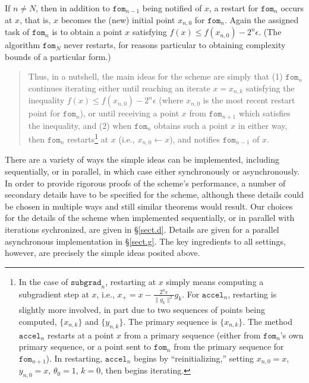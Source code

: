 \documentclass[reqno, 11pt]{amsart}
\numberwithin{equation}{section}
\newcommand{\fom}{\mathtt{fom}}
\newcommand{\subgrad}{\mathtt{subgrad}}
\newcommand{\accel}{\mathtt{accel}}
\begin{document}
If $ n \neq N $, then in addition to $ \fom_{n-1} $ being notified of $ x $, a restart for $ \fom_n $ occurs at $ x $, that is, $ x $ becomes the (new) initial point $ x_{n,0} $ for $ \fom_n $. Again the assigned task of $ \fom_n $ is to obtain a point $ x $ satisfying $ f(x) \leq f(x_{n,0}) -  2^n \epsilon $. (The algorithm $ \fom_N $ never restarts, for reasons particular to obtaining complexity bounds of a particular form.)
\vspace{2mm}

\begin{quote} 
Thus, in a nutshell, the main ideas for the scheme are simply that (1) $ \fom_n $ continues iterating either until reaching an iterate $ x = x_{n,k} $ satisfying the inequality $ f(x) \leq f(x_{n,0}) -  2^n \epsilon $ (where $ x_{n,0} $ is the most recent restart point for $ \fom_n $), or until receiving a point $ x $ from $ \fom_{n+1} $ which satisfies the inequality, and (2) when $ \fom_n $ obtains such a point $ x $ in either way, then $ \fom_n $ restarts\footnote{In the case of $ \subgrad_n $, restarting at $ x $ simply means computing a subgradient step at $ x $, i.e., $ x_+ = x - \frac{2^n \epsilon }{\| g_k \|^2} g_k $. For $ \accel_n $, restarting is slightly more involved, in part due to two sequences of points being computed, $ \{ x_{n,k} \} $ and $ \{  y_{n,k} \}  $. The primary sequence is $ \{ x_{n,k} \} $. The method $ \accel_n $ restarts at a point $ x $ from a primary sequence (either from $ \fom_n $'s own primary sequence, or a point sent to $ \fom_n $ from the primary sequence for $ \fom_{n+1} $). In restarting, $ \accel_n $ begins by ``reinitializing,'' setting $ x_{n,0} = x $, $ y_{n,0} = x $, $ \theta_0 = 1 $, $ k = 0 $, then begins iterating.} at $ x $ (i.e., $ x_{n,0} \leftarrow x $), and notifies $ \fom_{n-1} $ of $ x $.
\end{quote}
\vspace{2mm}

There are a variety of ways the simple ideas can be implemented, including sequentially, or in parallel, in which case either synchronously or asynchronously. In order to provide rigorous proofs of the scheme's performance, a number of secondary details have to be specified for the scheme, although these details could be chosen in multiple ways and still similar theorems would result. Our choices for the details of the scheme when implemented sequentially, or in parallel with iterations sychronized, are given in \S\ref{sect.d}. Details are given for a parallel asynchronous implementation in \S\ref{sect.g}. The key ingredients to all settings, however, are precisely the simple ideas posited above.
\end{document}
